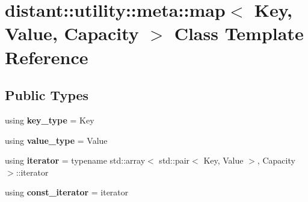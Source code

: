 \hypertarget{classdistant_1_1utility_1_1meta_1_1map}{}\section{distant\+:\+:utility\+:\+:meta\+:\+:map$<$ Key, Value, Capacity $>$ Class Template Reference}
\label{classdistant_1_1utility_1_1meta_1_1map}
\subsection*{Public Types}
\begin{DoxyCompactItemize}
\item 
\mbox{\label{classdistant_1_1utility_1_1meta_1_1map_a00546c122d1b95e247aecb268fda431d}} 
using {\bfseries key\+\_\+type} = Key
\item 
\mbox{\label{classdistant_1_1utility_1_1meta_1_1map_a6b28ae660d1179637deeab6e630648ce}} 
using {\bfseries value\+\_\+type} = Value
\item 
\mbox{\label{classdistant_1_1utility_1_1meta_1_1map_a962000dd1ab39363be4741a3b198687d}} 
using {\bfseries iterator} = typename std\+::array$<$ std\+::pair$<$ Key, Value $>$, Capacity $>$\+::iterator
\item 
\mbox{\label{classdistant_1_1utility_1_1meta_1_1map_a975a621fd5599bd1565656d36258454c}} 
using {\bfseries const\+\_\+iterator} = iterator
\end{DoxyCompactItemize}
